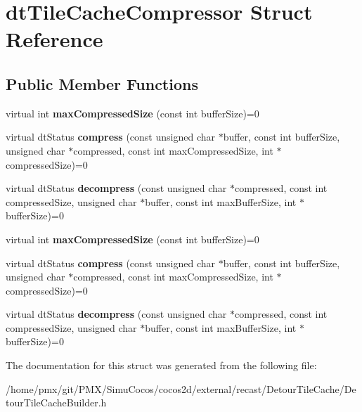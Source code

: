 \hypertarget{structdtTileCacheCompressor}{}\section{dt\+Tile\+Cache\+Compressor Struct Reference}
\label{structdtTileCacheCompressor}
\subsection*{Public Member Functions}
\begin{DoxyCompactItemize}
\item 
\mbox{\label{structdtTileCacheCompressor_aaa7fcfc5889a5f3fc5fbf689bbbc1494}} 
virtual int {\bfseries max\+Compressed\+Size} (const int buffer\+Size)=0
\item 
\mbox{\label{structdtTileCacheCompressor_ad117fb147426232344a3a1d83b572182}} 
virtual dt\+Status {\bfseries compress} (const unsigned char $\ast$buffer, const int buffer\+Size, unsigned char $\ast$compressed, const int max\+Compressed\+Size, int $\ast$compressed\+Size)=0
\item 
\mbox{\label{structdtTileCacheCompressor_a16d46b3a4c03c9d5b89998c80c247ab6}} 
virtual dt\+Status {\bfseries decompress} (const unsigned char $\ast$compressed, const int compressed\+Size, unsigned char $\ast$buffer, const int max\+Buffer\+Size, int $\ast$buffer\+Size)=0
\item 
\mbox{\label{structdtTileCacheCompressor_aaa7fcfc5889a5f3fc5fbf689bbbc1494}} 
virtual int {\bfseries max\+Compressed\+Size} (const int buffer\+Size)=0
\item 
\mbox{\label{structdtTileCacheCompressor_ad117fb147426232344a3a1d83b572182}} 
virtual dt\+Status {\bfseries compress} (const unsigned char $\ast$buffer, const int buffer\+Size, unsigned char $\ast$compressed, const int max\+Compressed\+Size, int $\ast$compressed\+Size)=0
\item 
\mbox{\label{structdtTileCacheCompressor_a16d46b3a4c03c9d5b89998c80c247ab6}} 
virtual dt\+Status {\bfseries decompress} (const unsigned char $\ast$compressed, const int compressed\+Size, unsigned char $\ast$buffer, const int max\+Buffer\+Size, int $\ast$buffer\+Size)=0
\end{DoxyCompactItemize}


The documentation for this struct was generated from the following file\+:\begin{DoxyCompactItemize}
\item 
/home/pmx/git/\+P\+M\+X/\+Simu\+Cocos/cocos2d/external/recast/\+Detour\+Tile\+Cache/Detour\+Tile\+Cache\+Builder.\+h\end{DoxyCompactItemize}
